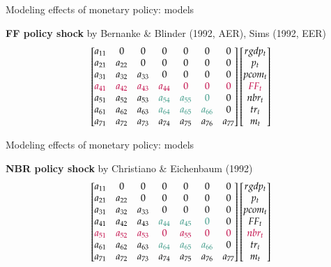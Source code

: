 \documentclass[notes,blackandwhite,mathsans,usenames,dvipsnames]{beamer}
\begin{document}
\begin{frame}{Modeling effects of monetary policy: {\color{purple}models}}

\textbf{FF policy shock}
{\footnotesize \color{mcxs2}by Bernanke \& Blinder (1992, AER), Sims (1992, EER)}
\begin{equation*}
\begin{bmatrix} 
a_{11} &0&0&0&0&0&0 \\ 
a_{21} &a_{22}&0&0&0&0&0 \\ 
a_{31} &a_{32}&a_{33}&0&0&0&0 \\ 
\color{purple}a_{41} &\color{purple}a_{42}&\color{purple}a_{43}&\color{purple}a_{44}&\color{purple}0&\color{purple}0&\color{purple}0 \\ 
a_{51} &a_{52}&a_{53}&\color{mcxs2}a_{54}&\color{mcxs2}a_{55}&\color{mcxs2}0&0 \\ 
a_{61} &a_{62}&a_{63}&\color{mcxs2}a_{64}&\color{mcxs2}a_{65}&\color{mcxs2}a_{66}&0 \\ 
a_{71} &a_{72}&a_{73}&a_{74}&a_{75}&a_{76}&a_{77} 
\end{bmatrix}
\begin{bmatrix}   rgdp_t \\   p_t \\   pcom_t \\ {\color{purple}FF_t} \\   nbr_t \\   tr_t \\   m_t \end{bmatrix}
\end{equation*}
\end{frame}

\begin{frame}{Modeling effects of monetary policy: {\color{purple}models}}

\textbf{NBR policy shock}
{\footnotesize \color{mcxs2}by Christiano \& Eichenbaum (1992)}
\begin{equation*}
\begin{bmatrix} 
a_{11} &0&0&0&0&0&0 \\ 
a_{21} &a_{22}&0&0&0&0&0 \\ 
a_{31} &a_{32}&a_{33}&0&0&0&0 \\ 
a_{41} &a_{42}&a_{43}&\color{mcxs2}a_{44}&\color{mcxs2}a_{45}&\color{mcxs2}0&0 \\ 
\color{purple}a_{51} &\color{purple}a_{52}&\color{purple}a_{53}&\color{purple}0&\color{purple}a_{55}&\color{purple}0&\color{purple}0 \\ 
a_{61} &a_{62}&a_{63}&\color{mcxs2}a_{64}&\color{mcxs2}a_{65}&\color{mcxs2}a_{66}&0 \\ 
a_{71} &a_{72}&a_{73}&a_{74}&a_{75}&a_{76}&a_{77} 
\end{bmatrix}
\begin{bmatrix}   rgdp_t \\   p_t \\   pcom_t \\ FF_t \\ {\color{purple}  nbr_t} \\   tr_t \\   m_t \end{bmatrix}
\end{equation*}
\end{frame}
\end{document}
